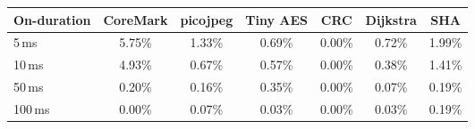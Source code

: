 \begin{tabular}{@{}l|cccccc@{}}
\toprule
\textbf{On-duration} & \textbf{\textsf{CoreMark}} & \textbf{\textsf{picojpeg}} & \textbf{\textsf{Tiny AES}} & \textbf{\textsf{CRC}} & \textbf{\textsf{Dijkstra}} & \textbf{\textsf{SHA}} \\ \midrule
5\,ms & \colorbox{hightlight!28!white}{5.75\%} & \colorbox{hightlight!6!white}{1.33\%} & \colorbox{hightlight!3!white}{0.69\%} & \colorbox{hightlight!0!white}{0.00\%} & \colorbox{hightlight!3!white}{0.72\%} & \colorbox{hightlight!9!white}{1.99\%} \\
10\,ms & \colorbox{hightlight!24!white}{4.93\%} & \colorbox{hightlight!3!white}{0.67\%} & \colorbox{hightlight!2!white}{0.57\%} & \colorbox{hightlight!0!white}{0.00\%} & \colorbox{hightlight!1!white}{0.38\%} & \colorbox{hightlight!7!white}{1.41\%} \\
50\,ms & \colorbox{hightlight!0!white}{0.20\%} & \colorbox{hightlight!0!white}{0.16\%} & \colorbox{hightlight!1!white}{0.35\%} & \colorbox{hightlight!0!white}{0.00\%} & \colorbox{hightlight!0!white}{0.07\%} & \colorbox{hightlight!0!white}{0.19\%} \\
100\,ms & \colorbox{hightlight!0!white}{0.00\%} & \colorbox{hightlight!0!white}{0.07\%} & \colorbox{hightlight!0!white}{0.03\%} & \colorbox{hightlight!0!white}{0.00\%} & \colorbox{hightlight!0!white}{0.03\%} & \colorbox{hightlight!0!white}{0.19\%} \\
 \bottomrule
\end{tabular}
